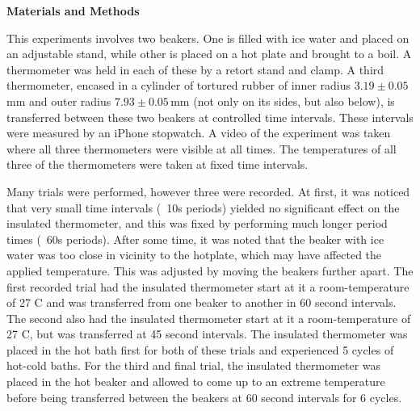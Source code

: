 \documentclass[11pt]{article}
\begin{document}
\begin{multicols}{2}
    \vspace{20pt}

     \selectfont \textbf{Materials and Methods}
    
     \selectfont 


    This experiments involves two beakers. One is filled with ice water and placed on an adjustable stand, while other is placed on a hot plate and brought to a boil. A thermometer was held in each of these by a retort stand and clamp. A third thermometer, encased in a cylinder of tortured rubber of inner radius $3.19 \pm 0.05\, $mm and outer radius $7.93 \pm 0.05\, $mm (not only on its sides, but also below), is transferred between these two beakers at controlled time intervals.  These intervals were measured by an iPhone stopwatch. A video of the experiment was taken where all three thermometers were visible at all times. The temperatures of all three of the thermometers were taken at fixed time intervals.
    
    Many trials were performed, however three were recorded. At first, it was noticed that very small time intervals (~10s periods) yielded no significant effect on the insulated thermometer, and this was fixed by performing much longer period times (~60s periods). After some time, it was noted that the beaker with ice water was too close in vicinity to the hotplate, which may have affected the applied temperature. This was adjusted by moving the beakers further apart. The first recorded trial had the insulated thermometer start at it a room-temperature of 27 \textdegree C and was transferred from one beaker to another in 60 second intervals. The second also had the insulated thermometer start at it a room-temperature of 27 \textdegree C, but was transferred at 45 second intervals. The insulated thermometer was placed in the hot bath first for both of these trials and experienced 5 cycles of hot-cold baths. For the third and final trial, the insulated thermometer was placed in the hot beaker and allowed to come up to an extreme temperature before being transferred between the beakers at 60 second intervals for 6 cycles.


\end{multicols}
\end{document}
